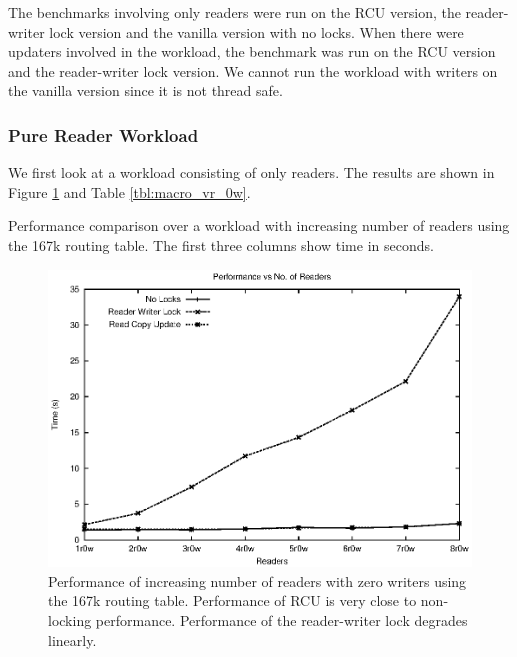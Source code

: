\documentclass[a4paper]{article}
\begin{document}
The benchmarks involving only readers were run on the RCU version,
the reader-writer lock version and the vanilla version with no
locks. When there were updaters involved in the workload, the benchmark
was run on the RCU version and the reader-writer lock version. We
cannot run the workload with writers on the vanilla version since it
is not thread safe.

\subsubsection{Pure Reader Workload}
 We first look at a workload consisting of only readers. The results
 are shown in Figure \ref{img:macro_vr_0w} and Table
 \ref{tbl:macro_vr_0w}.

\begin{table}[tph]
\begin{center}
\scalebox{0.9} {

}
\end{center}
\caption{Performance comparison over a workload with increasing number of readers using the 167k routing table. The first three columns show time in seconds.}
\label{tbl:macro_vr_0w}
\end{table}

\begin{figure}[tph]
\centering
\includegraphics[scale=0.8]{../images/graphs/macro_vr_0w}
\caption[justification=justified]{Performance of increasing number of readers with zero writers using the 167k routing table. Performance of RCU is very close to non-locking performance. Performance of the reader-writer lock degrades linearly.}
\label{img:macro_vr_0w}
\end{figure}
\end{document}

